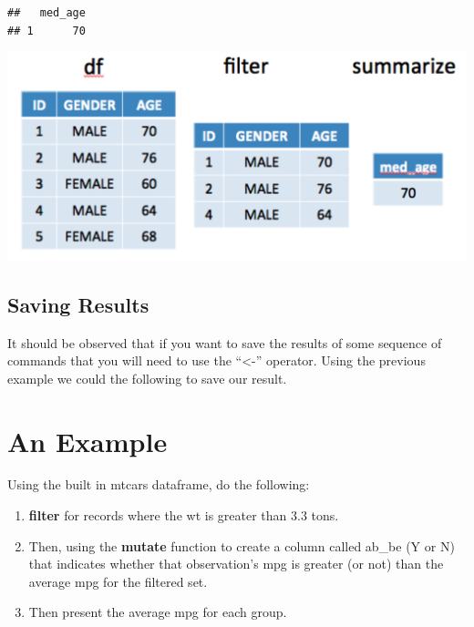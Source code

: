 \documentclass[]{book}
\newenvironment{Shaded}{\begin{snugshade}}{\end{snugshade}}
\newcommand{\DataTypeTok}[1]{\textcolor[rgb]{0.13,0.29,0.53}{#1}}
\newcommand{\KeywordTok}[1]{\textcolor[rgb]{0.13,0.29,0.53}{\textbf{#1}}}
\newcommand{\NormalTok}[1]{#1}
\newcommand{\OperatorTok}[1]{\textcolor[rgb]{0.81,0.36,0.00}{\textbf{#1}}}
\newcommand{\StringTok}[1]{\textcolor[rgb]{0.31,0.60,0.02}{#1}}
\begin{document}
\begin{verbatim}
##   med_age
## 1      70
\end{verbatim}

\includegraphics{./figures/chrt.png}

\hypertarget{saving-results}{%
\subsection{Saving Results}\label{saving-results}}

It should be observed that if you want to save the results of some sequence of commands that you will need to use the ``\textless{}-'' operator. Using the previous example we could the following to save our result.

\begin{Shaded}
\end{Shaded}

\hypertarget{an-example}{%
\section{An Example}\label{an-example}}

Using the built in mtcars dataframe, do the following:

\begin{enumerate}
\def\labelenumi{\arabic{enumi})}
\item
  \textbf{filter} for records where the wt is greater than 3.3 tons.
\item
  Then, using the \textbf{mutate} function to create a column called
  ab\_be (Y or N) that indicates whether that observation's
  mpg is greater (or not) than the average mpg for the filtered set.
\item
  Then present the average mpg for each group.
\end{enumerate}
\end{document}
